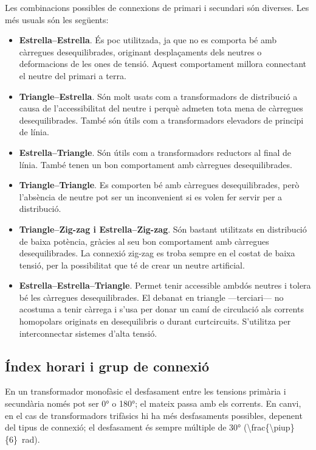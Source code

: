 Les combinacions possibles de connexions de primari i secundari són diverses. Les més usuals són les següents:
\begin{itemize}
   \item \textbf{Estrella--Estrella}. És poc utilitzada, ja que no es comporta bé amb càrregues desequilibrades, originant desplaçaments dels neutres o deformacions de les ones de tensió. Aquest comportament millora connectant el neutre del primari a terra. 
   \item \textbf{Triangle--Estrella}. Són molt usats com a transformadors de distribució a causa de l'accessibilitat del neutre i perquè admeten tota mena de càrregues desequilibrades. També són útils com a transformadors elevadors de principi de línia.
   \item \textbf{Estrella--Triangle}. Són útils com a transformadors reductors al final de línia. També tenen un bon comportament  amb càrregues desequilibrades.
   \item \textbf{Triangle--Triangle}. Es comporten bé amb càrregues desequilibrades, però l'absència de neutre pot ser un inconvenient si es volen fer servir per a distribució.
   \item \textbf{Triangle--Zig-zag i Estrella--Zig-zag}. Són bastant utilitzats en distribució de baixa potència, gràcies al seu bon comportament amb càrregues desequilibrades. La connexió zig-zag es troba sempre en el costat de baixa tensió, per la possibilitat que té de crear un neutre artificial.
   \item \textbf{Estrella--Estrella--Triangle}. Permet tenir accessible ambdós  neutres i tolera  bé les càrregues  desequilibrades. El debanat en triangle ---terciari--- no acostuma a tenir càrrega i s'usa per donar un camí de circulació als corrents homopolars originats en desequilibris o durant curtcircuits. S'utilitza per interconnectar sistemes d'alta tensió.
\end{itemize}


\subsection{Índex horari i grup de connexió}\label{sec:connex-index-horari}

En un transformador monofàsic el desfasament entre les tensions primària i secundària només pot ser \ang{0} o \ang{180}; el mateix passa amb els corrents. En canvi, en el cas de transformadors trifàsics hi ha més desfasaments possibles, depenent del tipus de connexió; el desfasament és sempre múltiple de \ang{30} 
(\qty[parse-numbers=false]{\frac{\piup}{6}}{rad}).

